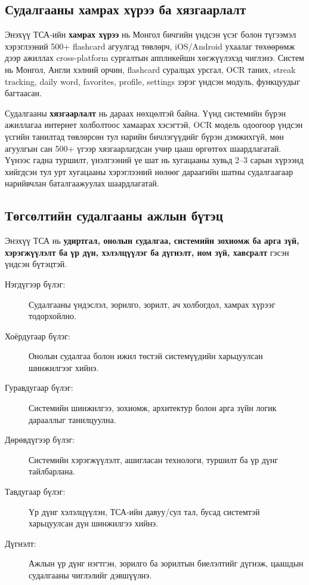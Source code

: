 \subsection{Судалгааны хамрах хүрээ ба хязгаарлалт}
\label{subsec:scope}

Энэхүү ТСА-ийн \textbf{хамрах хүрээ} нь Монгол бичгийн үндсэн үсэг болон түгээмэл хэрэглээний 500+ flashcard агуулгад төвлөрч, iOS/Android ухаалаг төхөөрөмж дээр ажиллах cross-platform сургалтын аппликейшн хөгжүүлэхэд чиглэнэ. Систем нь Монгол, Англи хэлний орчин, flashcard суралцах урсгал, OCR таних, streak tracking, daily word, favorites, profile, settings зэрэг үндсэн модуль, функцуудыг багтаасан.

Судалгааны \textbf{хязгаарлалт} нь дараах нөхцөлтэй байна. Үүнд системийн бүрэн ажиллагаа интернет холболтоос хамаарах хэсэгтэй, OCR модель одоогоор үндсэн үсгийн танилтад төвлөрсөн тул нарийн бичлэгүүдийг бүрэн дэмжихгүй, мөн агуулгын сан 500+ үгээр хязгаарлагдсан учир цааш өргөтгөх шаардлагатай. Үүнээс гадна туршилт, үнэлгээний үе шат нь хугацааны хувьд 2--3 сарын хүрээнд хийгдсэн тул урт хугацааны хэрэглээний нөлөөг дараагийн шатны судалгаагаар нарийвчлан баталгаажуулах шаардлагатай.

\subsection{Төгсөлтийн судалгааны ажлын бүтэц}
\label{subsec:structure}

Энэхүү ТСА нь \textbf{удиртгал, онолын судалгаа, системийн зохиомж ба арга зүй, хэрэгжүүлэлт ба үр дүн, хэлэлцүүлэг ба дүгнэлт, ном зүй, хавсралт} гэсэн үндсэн бүтэцтэй.

\begin{description}
    \item[Нэгдүгээр бүлэг:] Судалгааны үндэслэл, зорилго, зорилт, ач холбогдол, хамрах хүрээг тодорхойлно.
    
    \item[Хоёрдугаар бүлэг:] Онолын судалгаа болон ижил төстэй системүүдийн харьцуулсан шинжилгээг хийнэ.
    
    \item[Гуравдугаар бүлэг:] Системийн шинжилгээ, зохиомж, архитектур болон арга зүйн логик дарааллыг танилцуулна.
    
    \item[Дөрөвдүгээр бүлэг:] Системийн хэрэгжүүлэлт, ашигласан технологи, туршилт ба үр дүнг тайлбарлана.
    
    \item[Тавдугаар бүлэг:] Үр дүнг хэлэлцүүлэн, ТСА-ийн давуу/сул тал, бусад системтэй харьцуулсан дүн шинжилгээ хийнэ.

    \item[Дүгнэлт:] Ажлын үр дүнг нэгтгэн, зорилго ба зорилтын биелэлтийг дүгнэж, цаашдын судалгааны чиглэлийг дэвшүүлнэ.
\end{description}

\vfill
